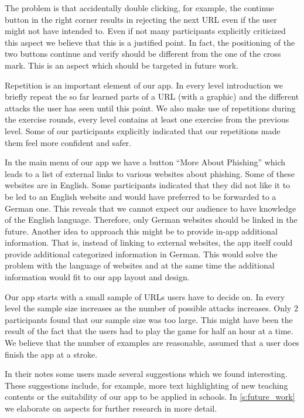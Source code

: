 \begin{description}[leftmargin=0cm]
The problem is that accidentally double clicking, for example, the continue button in the right corner results in rejecting the next URL even if the user might not have intended to.
Even if not many participants explicitly criticized this aspect we believe that this is a justified point.
In fact, the positioning of the two buttons continue and verify should be different from the one of the cross mark.
This is an aspect which should be targeted in future work. 
	\item[Repetition:]
Repetition is an important element of our app.
In every level introduction we briefly repeat the so far learned parts of a URL (with a graphic) and the different attacks the user has seen until this point.
We also make use of repetitions during the exercise rounds, every level contains at least one exercise from the previous level.
Some of our participants explicitly indicated that our repetitions made them feel more confident and safer.
	\item[External Links:]
In the main menu of our app we have a button ``More About Phishing'' which leads to a list of external links to various websites about phishing.
Some of these websites are in English.
Some participants indicated that they did not like it to be led to an English website and would have preferred to be forwarded to a German one.
This reveals that we cannot expect our audience to have knowledge of the English language.
Therefore, only German websites should be linked in the future.
Another idea to approach this might be to provide in-app additional information.
That is, instead of linking to external websites, the app itself could provide additional categorized information in German.
This would solve the problem with the language of websites and at the same time the additional information would fit to our app layout and design.
	\item[Amount of Examples:] Our app starts with a small sample of URLs users have to decide on.
In every level the sample size increases as the number of possible attacks increases.
Only 2 participants found that our sample size was too large.
This might have been the result of the fact that the users had to play the game for half an hour at a time.
We believe that the number of examples are reasonable, assumed that a user does finish the app at a stroke.
	\item[Further Suggestions:] In their notes some users made several suggestions which we found interesting.
These suggestions include, for example, more text highlighting of new teaching contents or the suitability of our app to be applied in schools.
In \autoref{s:future_work} we elaborate on aspects for further research in more detail.
\end{description}

